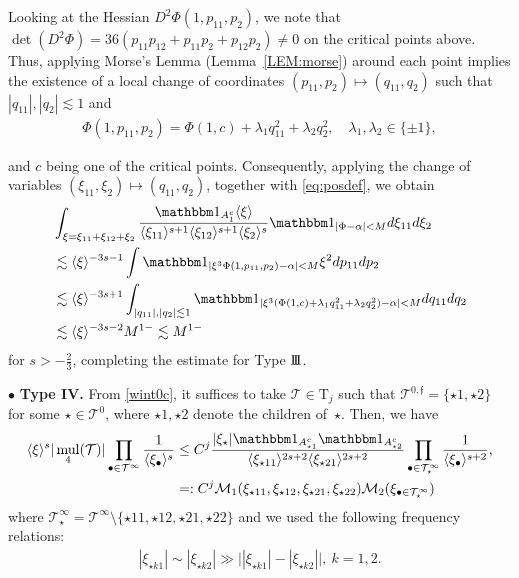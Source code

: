 \documentclass[a4paper,
11pt,  reqno]{amsart}
\newcommand{\III}{\textup{I \hspace{-2.9mm} I \hspace{-2.9mm} I}}
\newcommand{\5}{\textup{V}}
\newcommand{\noi}{\noindent}
\newcommand{\ind}{\mathbbm 1}
\newcommand{\les}{\lesssim}
\theoremstyle{remark}
\newcommand{\bul}{\bullet}
\newcommand{\TT}{\mathcal{T}}
\newcommand{\Tr}{\mathrm{T}}
\newcommand{\al}{\alpha}
\newcommand{\jb}[1]
{\langle #1 \rangle}
\newcommand{\ff}{\mathfrak{f}}
\newcommand{\M}{\mathcal{M}}
\DeclareMathOperator{\mul}{mul}
\numberwithin{equation}{section}
\numberwithin{theorem}{section}
\begin{document}
\noi
Looking at the Hessian $D^2 \Phi(1, p_{11}, p_2)$, we note that
{
$\det (D^2 \Phi) = 36 (p_{11} p_{12} + p_{11} p_2 + p_{12} p_2) \ne0 $
}
on the critical points above. Thus, applying Morse's Lemma (Lemma~\ref{LEM:morse}) around each point implies the existence of a local change of coordinates $(p_{11},p_2) \mapsto (q_{11}, q_2)$ such that $|q_{11}|, |q_2| \les 1$ and
\begin{align}
\Phi(1, p_{11},p_2) = \Phi(1, c) + \lambda_1q_{11}^2 + \lambda_2q_2^2, \quad \lambda_1,\lambda_2\in\{\pm1\},
\end{align}


\noi
{and $c$ being one of the critical points.}
Consequently, applying the change of variables $(\xi_{11},\xi_2) \mapsto (q_{11}, q_2)$, together with \eqref{eq:posdef}, we obtain
\begin{align}
&
\int_{\xi = \xi_{11} + \xi_{12} + \xi_2} \frac{\ind_{A_1^c}  \jb{\xi}}{ \jb{\xi_{11}}^{s+1} \jb{\xi_{12}}^{s+1} \jb{\xi_2}^s}
\ind_{|\Phi - \al| < M}
d\xi_{11} d\xi_2
\\
&
\les
\jb{\xi}^{ - 3 s - 1   } \int \ind_{|\xi^3 \Phi(1, p_{11}, p_2) - \al| < M} \xi^2 dp_{11} dp_2
\\
&
\les
\jb{\xi}^{- 3s + 1  } \int_{|q_{11}|, |q_2| \les 1} \ind_{| \xi^3( \Phi(1,c) + \lambda_1q_{11}^2 +  \lambda_2q_2^2 )- \al | < M  } dq_{11} d q_2
\\
&
\les
\jb{\xi}^{- 3s -2   } M^{1-} \les M^{1-}
\end{align}
for $s>-\frac23$, completing the estimate for Type $\III$.


\smallskip



\noi
$\bul$ \textbf{Type IV.}
From \eqref{wint0c}, it suffices to take
$\TT\in\Tr_j$ such that $\TT^{0,\ff} = \{\star1,\star2\}$ for some $\star\in \TT^0$, where $\star1,\star2$ denote the children of~$\star$.
Then, we have
\begin{align}\label{L24}
\jb{\xi}^s  |\mul_4(\TT)|
\prod_{\bul \in \TT^\infty} \frac{1}{\jb{\xi_\bul}^s}
&\le
C^{j}
\frac{|\xi_\star| \ind_{A^c_{\star1}} \ind_{A^c_{\star2}} }{
\jb{\xi_{\star11}}^{2s+2} \jb{\xi_{\star21}}^{2s+2}  } \prod_{\bul\in \TT^\infty_\star} \frac{1}{\jb{\xi_\bul}^{s+2}}, \\ &=:
{C^j}
\mathcal{M}_1(\xi_{\star11}, \xi_{\star12}, \xi_{\star21}, \xi_{\star22})
\M_2(\xi_{\bul\in\TT^\infty_\star})
\end{align}
where $\TT^\infty_\star = \TT^\infty \setminus\{ \star11, \star12, \star21, \star22\}$ and we used the following frequency relations:
\begin{align}\label{L24freq}
|\xi_{\star k 1 } | \sim |\xi_{\star k2 } | \gg \big| |\xi_{\star k 1} | - |\xi_{\star k 2 }| \big|, \ k=1,2.
\end{align}
\end{document}
